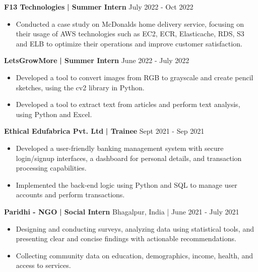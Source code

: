\documentclass[a4paper]{article}
\begin{document}
\vspace{-2mm}
      \textbf{F13 Technologies}\textbf{ | Summer Intern} \hfill  July 2022 - Oct 2022\\
          \vspace{-3mm}
\begin{itemize} \itemsep -5pt
\item  Conducted a case study on McDonald\textquotesingle{}s home delivery service, focusing on their usage of AWS technologies such as EC2, ECR, Elasticache, RDS, S3 and ELB to optimize their operations and improve customer satisfaction.
\end{itemize}


\vspace{-2mm}
      \textbf{LetsGrowMore}\textbf{ | Summer Intern} \hfill  June 2022 - July 2022\\
          \vspace{-3mm}
\begin{itemize} \itemsep -5pt
\item  Developed a tool to convert images from RGB to grayscale and create pencil sketches, using the cv2 library in Python.
\item  Developed a tool to extract text from articles and perform text analysis, using Python and Excel.
\end{itemize}


\vspace{-2mm}
      \textbf{Ethical Edufabrica Pvt. Ltd}\textbf{ | Trainee} \hfill  Sept 2021 - Sep 2021\\
          \vspace{-3mm}
\begin{itemize} \itemsep -3pt
\item  Developed a user-friendly banking management system with secure login/signup interfaces, a dashboard for personal details, and transaction processing capabilities.
\item  Implemented the back-end logic using Python and SQL to manage user accounts and perform transactions.
\end{itemize}

\vspace{-2mm}
      \textbf{Paridhi - NGO}\textbf{ | Social Intern} \hfill Bhagalpur, India | June 2021 - July 2021\\
          \vspace{-3mm}
\begin{itemize} \itemsep -3pt
\item Designing and conducting surveys, analyzing data using statistical tools, and presenting clear and concise findings with actionable recommendations.
\item  Collecting community data on education, demographics, income, health, and access to services.
\end{itemize}
\end{document}
